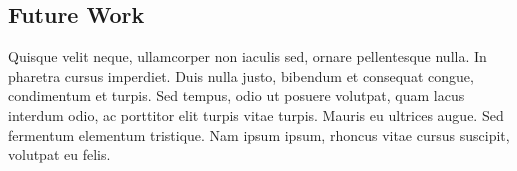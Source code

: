 \documentclass[10pt]{article}
\begin{document}
\begin{multicols}{2}
		\section*{Future Work}
		Quisque velit neque, ullamcorper non iaculis sed, ornare pellentesque nulla. In pharetra cursus imperdiet. Duis nulla justo, bibendum et consequat congue, condimentum et turpis. Sed tempus, odio ut posuere volutpat, quam lacus interdum odio, ac porttitor elit turpis vitae turpis. Mauris eu ultrices augue. Sed fermentum elementum tristique. Nam ipsum ipsum, rhoncus vitae cursus suscipit, volutpat eu felis.

	\end{multicols}
\end{document}
